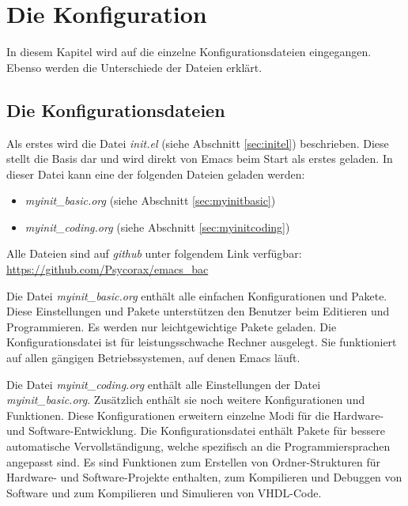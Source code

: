 \chapter{Die Konfiguration}
\label{cha:Konfiguration}
In diesem Kapitel wird auf die einzelne Konfigurationsdateien
eingegangen. Ebenso werden die Unterschiede der Dateien erklärt.

\section{Die Konfigurationsdateien}
\label{sec:konfigurationsdateien}
Als erstes wird die Datei \textit{init.el} (siehe Abschnitt
\ref{sec:initel}) beschrieben. Diese stellt die Basis dar und wird
direkt von Emacs beim Start als erstes geladen. In dieser Datei kann
eine der folgenden Dateien geladen werden:
\begin{itemize}
\item \textit{myinit\_basic.org} (siehe Abschnitt
  \ref{sec:myinitbasic})
\item \textit{myinit\_coding.org} (siehe Abschnitt
  \ref{sec:myinitcoding})
\end{itemize}

Alle Dateien sind auf \textit{github} unter folgendem Link verfügbar:
\url{https://github.com/Psycorax/emacs_bac}

Die Datei \textit{myinit\_basic.org} enthält alle einfachen
Konfigurationen und Pakete. Diese Einstellungen und Pakete
unterstützen den Benutzer beim Editieren und Programmieren. Es werden
nur {\glqq}leichtgewichtige{\grqq} Pakete geladen. Die
Konfigurationsdatei ist für leistungsschwache Rechner ausgelegt. Sie
funktioniert auf allen gängigen Betriebssystemen, auf denen Emacs
läuft.

Die Datei \textit{myinit\_coding.org} enthält alle Einstellungen der
Datei \textit{myinit\_basic.org}. Zusätzlich enthält sie noch weitere
Konfigurationen und Funktionen. Diese Konfigurationen erweitern
einzelne Modi für die Hardware- und Software-Entwicklung. Die
Konfigurationsdatei enthält Pakete für bessere automatische
Vervollständigung, welche spezifisch an die Programmiersprachen
angepasst sind. Es sind Funktionen zum Erstellen von Ordner-Strukturen
für Hardware- und Software-Projekte enthalten, zum Kompilieren und
Debuggen von Software und zum Kompilieren und Simulieren von
VHDL-Code.\\

